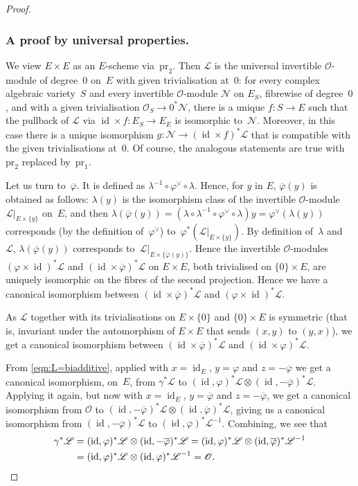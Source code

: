 \documentclass[JEP,XML,SOM,Unicode,NoFloatCountersInSection]{cedram}
\let\mathcal\mathscr
\let\oldvee\vee
\renewcommand{\vee}{{\scriptscriptstyle\oldvee}}
\theoremstyle{plain}
\theoremstyle{definition}
\numberwithin{equation}{subsection}
\let\ol\overline
\let\phi\varphi
\newcommand{\calL}{\mathcal{L}}
\newcommand{\calN}{\mathcal{N}}
\newcommand{\calO}{\mathcal{O}}
\newcommand{\pr}{\mathrm{pr}}
\DeclareMathOperator{\id}{id}
\begin{document}
\begin{proof}
\subsubsection*{A proof by universal properties.} We view
$E\times E$ as an $E$-scheme via~$\pr_2$. Then $\calL$ is the
universal invertible $\calO$-module of degree~$0$ on~$E$ with given
trivialisation at~$0$: for every complex algebraic variety~$S$ and
every invertible $\calO$-module $\calN$ on $E_S$, fibrewise of
degree~$0$, and with a given trivialisation $\calO_S\to 0^*\calN$,
there is a unique $f\colon S\to E$ such that the pullback of $\calL$
via $\id\times f\colon E_S\to E_E$ is isomorphic to~$\calN$. Moreover,
in this case there is a unique isomorphism $g\colon \calN\to
(\id\times f)^*\calL$ that is compatible with the given
trivialisations at~$0$. Of course, the analogous statements are true
with $\pr_2$ replaced by~$\pr_1$.

Let us turn to~$\ol{\phi}$. It is defined as
$\lambda^{-1}\circ\phi^\vee\circ\lambda$. Hence, for $y$ in $E$,
$\ol{\phi}(y)$ is obtained as follows: $\lambda(y)$ is the isomorphism
class of the invertible $\calO$-module $\calL|_{E\times\{y\}}$ on~$E$,
and then
$\lambda(\ol{\phi}(y))=
(\lambda\circ\lambda^{-1}\circ\phi^\vee\circ\lambda)y
=\phi^\vee(\lambda(y))$ corresponds (by the definition of~$\phi^\vee$)
to~$\phi^*(\calL|_{E\times\{y\}})$. By definition of~$\lambda$
and~$\calL$, $\lambda(\ol{\phi}(y))$ corresponds
to~$\calL|_{E\times\{\ol{\phi}(y)\}}$. Hence the invertible
$\calO$-modules $(\phi\times\id)^*\calL$ and
$(\id\times\ol{\phi})^*\calL$ on $E\times E$, both trivialised on
$\{0\}\times E$, are uniquely isomorphic on the fibres of the
second projection. Hence we have a canonical isomorphism
between $(\id\times\ol{\phi})^*\calL$ and $(\phi\times\id)^*\calL$.

As $\calL$ together with its trivialisations on $E\times\{0\}$ and
$\{0\}\times E$ is symmetric (that is, invariant under the
automorphism of $E\times E$ that sends $(x,y)$ to $(y,x)$), we get a
canonical isomorphism between $(\id\times\ol{\phi})^*\calL$ and
$(\id\times \phi)^*\calL$.

From \eqref{eqn:L=biadditive}, applied with $x=\id_E$, $y=\phi$ and
$z=-\ol{\phi}$ we get a canonical isomorphism, on~$E$, from
$\gamma^*\calL$ to
$(\id,\phi)^*\calL\otimes(\id,-\ol{\phi})^*\calL$. Applying it again,
but now with $x=\id_E$, $y=\ol{\phi}$ and $z=-\ol{\phi}$, we get a
canonical isomorphism from $\calO$ to
$(\id,-\ol{\phi})^*\calL\otimes(\id,\ol{\phi})^*\calL$, giving us a
canonical isomorphism from $(\id,-\ol{\phi})^*\calL$ to
$(\id,\ol{\phi})^*\calL^{-1}$. Combining, we see that
\begin{align*}
\gamma^*\calL & = (\id,\phi)^*\calL\otimes(\id,-\ol{\phi})^*\calL
= (\id,\phi)^*\calL\otimes(\id,\ol{\phi})^*\calL^{-1} \\
& = (\id,\phi)^*\calL\otimes(\id,\phi)^*\calL^{-1} = \calO.\qedhere
\end{align*}
\end{proof}
\end{document}

